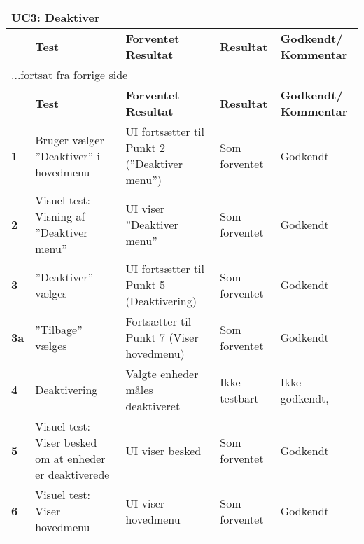 
\begin{center}
\begin{longtable}{|p{}|p{}|p{}|p{}|p{}|} %
\hline
\multicolumn{5}{|l|}{\textbf{UC3: Deaktiver}} \\ \hline
\multicolumn{1}{|c|}{} &
\textbf{Test} &
\textbf{Forventet \newline Resultat} &
\textbf{Resultat} &
\textbf{Godkendt/ \newline Kommentar} \\ \hline 
\endfirsthead

\multicolumn{5}{l}{...fortsat fra forrige side} \\ \hline 
\multicolumn{1}{|c|}{} &
\textbf{Test} &
\textbf{Forventet \newline Resultat} &
\textbf{Resultat} &
\textbf{Godkendt/ \newline Kommentar} \\ \hline 
\endhead


		
\textbf{1}			&Bruger vælger ''Deaktiver'' i hovedmenu															
					&UI fortsætter til Punkt 2 (''Deaktiver menu'')
					&Som \newline forventet
					&Godkendt \\\hline
					
\textbf{2}			&Visuel test: Visning af ''Deaktiver menu''																
					&UI viser ''Deaktiver menu''
					&Som \newline forventet
					&Godkendt \\\hline

\textbf{3}			&''Deaktiver'' vælges			
					&UI fortsætter til Punkt 5 (Deaktivering)
					&Som \newline forventet
					&Godkendt \\\hline
					
\textbf{3a}			&''Tilbage'' vælges			
					&Fortsætter til Punkt 7 (Viser hovedmenu)
					&Som \newline forventet
					&Godkendt \\\hline

\textbf{4}			&Deaktivering			
					&Valgte enheder måles deaktiveret
					&Ikke \newline testbart 
					&Ikke \newline godkendt,  \\\hline
		
\textbf{5}			&Visuel test: Viser besked om at enheder er deaktiverede
					&UI viser besked
					&Som \newline forventet
					&Godkendt \\\hline
					
\textbf{6}			&Visuel test: Viser hovedmenu
					&UI viser hovedmenu
					&Som \newline forventet
					&Godkendt \\\hline
					

	\end{longtable}
	\label{ATUC3} 
\end{center}